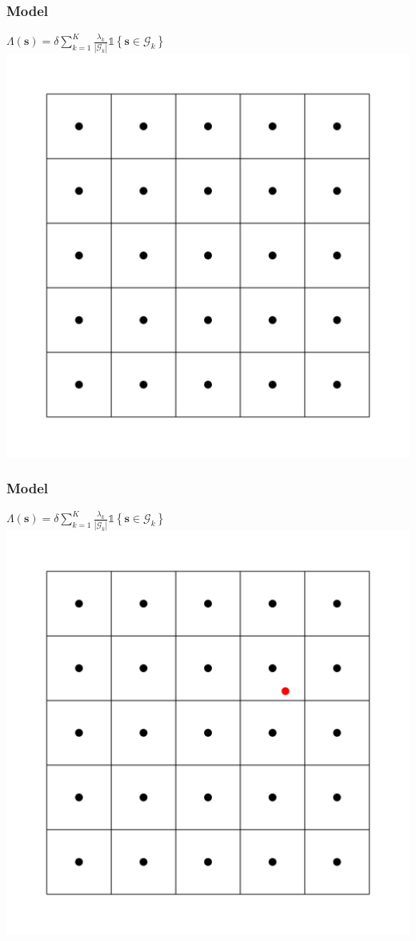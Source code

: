 \documentclass[10pt, compress]{beamer}
\begin{document}
  \begin{frame}
    \frametitle{Model}
    \centering
    $\Lambda(\mathbf{s}) = \delta \sum_{k=1}^K \frac{\lambda_k}{|\mathcal{G}_k|} \mathds{1} \left\{ \mathbf{s} \in \mathcal{G}_k \right\}$
    \includegraphics[height=0.8\textheight]{blank_grid.pdf}
  \end{frame}
  \begin{frame}
    \frametitle{Model}
    \centering
    $ \Lambda(\mathbf{s}) = \delta \sum_{k=1}^K \frac{\lambda_k}{|\mathcal{G}_k|} \mathds{1} \left\{ \mathbf{s} \in \mathcal{G}_k \right\} $
    \includegraphics[height=0.8\textheight]{grid_spot.pdf}
  \end{frame}
\end{document}
